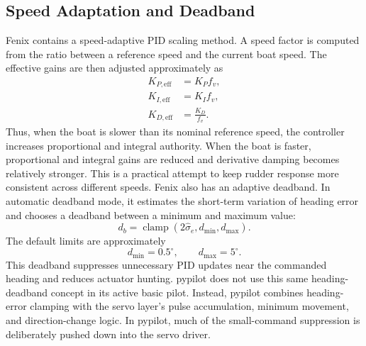\documentclass[10pt,twocolumn]{article}
\begin{document}
\subsection{Speed Adaptation and Deadband}
Fenix contains a speed-adaptive PID scaling method.  A speed factor is
computed from the ratio between a reference speed and the current boat
speed.  The effective gains are then adjusted approximately as
\[
\begin{aligned}
K_{P,\mathrm{eff}} &= K_P f_v,\\
K_{I,\mathrm{eff}} &= K_I f_v,\\
K_{D,\mathrm{eff}} &= \frac{K_D}{f_v}.
\end{aligned}
\]
Thus, when the boat is slower than its nominal reference speed, the
controller increases proportional and integral authority.  When the boat
is faster, proportional and integral gains are reduced and derivative
damping becomes relatively stronger.  This is a practical attempt to keep
rudder response more consistent across different speeds.
Fenix also has an adaptive deadband.  In automatic deadband mode, it
estimates the short-term variation of heading error and chooses a
deadband between a minimum and maximum value:
\[
d_b
=
\operatorname{clamp}
\left(
2 \hat{\sigma}_e,
d_{\min},
d_{\max}
\right).
\]
The default limits are approximately
\[
d_{\min}=0.5^\circ,
\qquad
d_{\max}=5^\circ .
\]
This deadband suppresses unnecessary PID updates near the commanded
heading and reduces actuator hunting.
pypilot does not use this same heading-deadband concept in its active
basic pilot.  Instead, pypilot combines heading-error clamping with the
servo layer's pulse accumulation, minimum movement, and direction-change
logic.  In pypilot, much of the small-command suppression is deliberately
pushed down into the servo driver.
\end{document}
